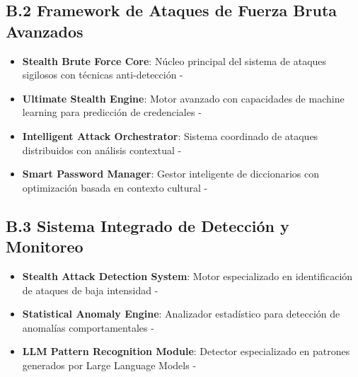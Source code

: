 \subsection*{B.2 Framework de Ataques de Fuerza Bruta Avanzados}
\begin{itemize}
    \item \textbf{Stealth Brute Force Core}: Núcleo principal del sistema de ataques sigilosos con técnicas anti-detección - 
    \item \textbf{Ultimate Stealth Engine}: Motor avanzado con capacidades de machine learning para predicción de credenciales - 
    \item \textbf{Intelligent Attack Orchestrator}: Sistema coordinado de ataques distribuidos con análisis contextual - 
    \item \textbf{Smart Password Manager}: Gestor inteligente de diccionarios con optimización basada en contexto cultural - 
\end{itemize}

\subsection*{B.3 Sistema Integrado de Detección y Monitoreo}
\begin{itemize}
    \item \textbf{Stealth Attack Detection System}: Motor especializado en identificación de ataques de baja intensidad - 
    \item \textbf{Statistical Anomaly Engine}: Analizador estadístico para detección de anomalías comportamentales - 
    \item \textbf{LLM Pattern Recognition Module}: Detector especializado en patrones generados por Large Language Models - 
\end{itemize}

